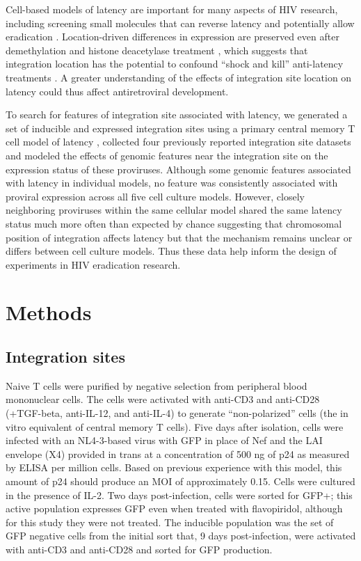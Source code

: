 \documentclass[../sherrill-Mix_thesis.tex]{subfiles}
\begin{document}
	Cell-based models of latency are important for many aspects of HIV research, including screening small molecules that can reverse latency and potentially allow eradication \citep{Shan2012,Boehm2013}. Location-driven differences in expression are preserved even after demethylation and histone deacetylase treatment \citep{Jordan2001}, which suggests that integration location has the potential to confound ``shock and kill'' anti-latency treatments \citep{Savarino2009,Archin2012}. A greater understanding of the effects of integration site location on latency could thus affect antiretroviral development. %

	To search for features of integration site associated with latency, we generated a set of inducible and expressed integration sites using a primary central memory \cdFour{} T cell model of latency \citep{Bosque2009,Bosque2011}, collected four previously reported integration site datasets and modeled the effects of genomic features near the integration site on the expression status of these proviruses.  Although some genomic features associated with latency in individual models, no feature was consistently associated with proviral expression across all five cell culture models. However, closely neighboring proviruses within the same cellular model shared the same latency status much more often than expected by chance suggesting that chromosomal position of integration affects latency but that the mechanism remains unclear or differs between cell culture models. Thus these data help inform the design of experiments in HIV eradication research.

\section{Methods}
	\subsection{Integration sites}
		Naive \cdFour{} T cells were purified by negative selection from peripheral blood mononuclear cells. The cells were activated with anti-CD3 and anti-CD28 (+TGF-beta, anti-IL-12, and anti-IL-4) to generate ``non-polarized'' cells (the in vitro equivalent of central memory T cells). Five days after isolation, cells were infected with an NL4-3-based virus with GFP in place of Nef and the LAI envelope (X4) provided in trans at a concentration of 500 ng of p24 as measured by ELISA per million cells. Based on previous experience with this model, this amount of p24 should produce an MOI of approximately 0.15. Cells were cultured in the presence of IL-2. Two days post-infection, cells were sorted for GFP+; this active population expresses GFP even when treated with flavopiridol, although for this study they were not treated. The inducible population was the set of GFP negative cells from the initial sort that, 9 days post-infection, were activated with anti-CD3 and anti-CD28 and sorted for GFP production. 
\end{document}
